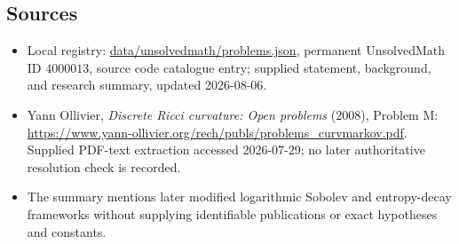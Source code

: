 \documentclass[11pt]{article}
\begin{document}
\subsection{Sources}
\begin{itemize}
\item Local registry: \url{data/unsolvedmath/problems.json}, permanent UnsolvedMath ID \(4000013\), source code catalogue entry; supplied statement, background, and research summary, updated 2026-08-06.
\item Yann Ollivier, \emph{Discrete Ricci curvature: Open problems} (2008), Problem M: \url{https://www.yann-ollivier.org/rech/publs/problems_curvmarkov.pdf}. Supplied PDF-text extraction accessed 2026-07-29; no later authoritative resolution check is recorded.
\item The summary mentions later modified logarithmic Sobolev and entropy-decay frameworks without supplying identifiable publications or exact hypotheses and constants.
\end{itemize}
\end{document}
